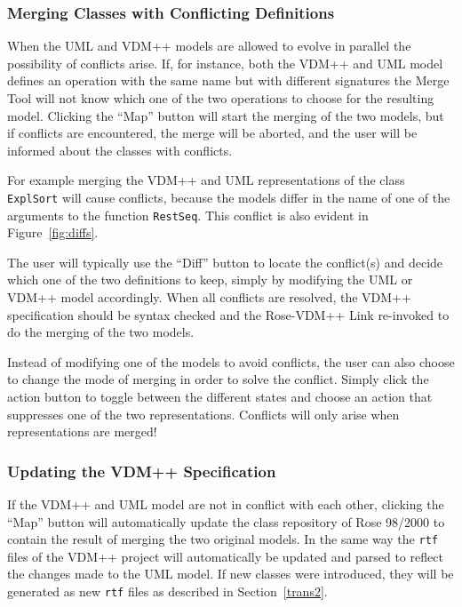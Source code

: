 \documentclass[\pformat,12pt]{article}
\newcommand{\vdmpp}{VDM++}
\newcommand{\link}{Rose-\vdmpp{} Link}
\newcommand{\rose}{Rose 98/2000}
\begin{document}
\subsubsection*{Merging Classes with Conflicting Definitions}
\label{mergingclasses}
 
When the UML and \vdmpp{} models are allowed to evolve in parallel the
possibility of conflicts arise. If, for instance, both the \vdmpp{}
and UML model defines an operation with the same name but with
different signatures the Merge Tool will not know which one of the two
operations to choose for the resulting model. Clicking the ``Map''
button will start the merging of the two models, but if conflicts are
encountered, the merge will be aborted, and the user will be informed
about the classes with conflicts.

For example merging the \vdmpp{} and UML representations of the class
{\tt ExplSort} will cause conflicts, because the models differ in the
name of one of the arguments to the function {\tt RestSeq}. This
conflict is also evident in Figure~\ref{fig:diffs}.

The user will typically use the ``Diff'' button to locate the
conflict(s) and decide which one of the two definitions to keep,
simply by modifying the UML or \vdmpp{} model accordingly. When all
conflicts are resolved, the \vdmpp{} specification should be syntax
checked and the \link{} re-invoked to do the merging of the two
models.

Instead of modifying one of the models to avoid conflicts, the user
can also choose to change the mode of merging in order to solve the
conflict. Simply click the action button to toggle between the
different states and choose an action that suppresses one of the two
representations. Conflicts will only arise when representations are
merged!

\subsubsection*{Updating the \vdmpp{} Specification}
\label{updating}
  
If the \vdmpp{} and UML model are not in conflict with each other,
clicking the ``Map'' button will automatically update the class
repository of \rose{} to contain the result of merging the two
original models.  In the same way the {\tt rtf} files of the \vdmpp{}
project will automatically be updated and parsed to reflect the
changes made to the UML model. If new classes were introduced, they
will be generated as new {\tt rtf} files as described in
Section~\ref{trans2}.
\end{document}
